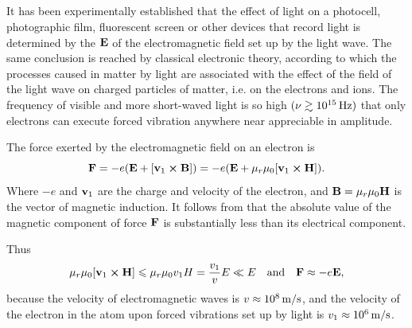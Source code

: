 \subsection{}\label{32.1.2} It has been experimentally established that the effect of light on a photocell, photographic film, fluorescent screen or other devices that record light is determined by the  $\vb{E}$ of the electromagnetic field set up by the light wave.
The same conclusion is reached by classical electronic theory,
according to which the processes caused in matter by light are
associated with the effect of the field of the light wave on charged particles of matter, i.e. on the electrons and ions. The frequency of visible and more short-waved light is so high $(\nu \gtrsim \SI{d15}{\hertz})$ that only electrons can execute forced vibration anywhere near appreciable in amplitude. 

The force exerted by the electromagnetic
field  on an electron is
\begin{equation*}%
\vb{F} = - e (\vb{E} + [\vb{v}_{1}\cross \vb{B}])  = -e (\vb{E} + \mu_{r}\mu_{0} [\vb{v}_{1}\cross \vb{H}]) .
\end{equation*}
Where $-e$ and $\vb{v}_{1}$ are the charge and velocity of the electron, and $\vb{B} = \mu_{r}\mu_{0}\vb{H}$ is the vector of magnetic induction. It follows from  that the absolute value of the magnetic component of force $\vb{F}$ is substantially less than its electrical component.

Thus
\begin{equation*}%
\mu_{r}\mu_{0} [\vb{v}_{1}\cross \vb{H}] \leqslant \mu_{r}\mu_{0} {v}_{1}H = \frac{v_{1}}{v} E \ll E \qand \vb{F} \approx -e \vb{E},
\end{equation*}
because the velocity of electromagnetic waves is $v \approx  \SI{d8}{\meter\per\second}$, and the velocity of the electron in the atom upon forced vibrations set up by light is $v_{1} \approx \SI{d6}{\meter\per\second}$.

